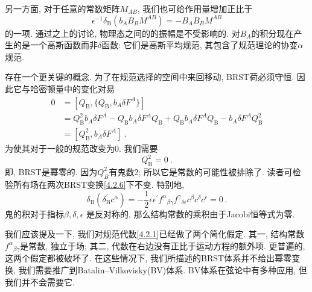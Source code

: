 另一方面, 对于任意的常数矩阵$M_{AB}$, 我们也可给作用量增加正比于
\begin{equation}
\epsilon^{-1} \delta_{\mathrm{B}}(b_{A} B_{B} M^{A B})=-B_{A} B_{B} M^{A B} \label{4.2.11}
\end{equation}
的一项. 通过之上的讨论, 物理态之间的的振幅是不受影响的. 对$B_{A}$的积分现在产生的是一个高斯函数而非$\delta$函数: 它们是高斯平均规范, 其包含了规范理论的协变$\alpha$规范. 

存在一个更关键的概念. 为了在规范选择的空间中来回移动, BRST荷必须守恒. 因此它与哈密顿量中的变化对易 
\begin{align}
0 &=[Q_{\mathrm{B}},\{Q_{\mathrm{B}}, b_{A} \delta F^{A}\}]  	\nonumber\\
&=Q_{\mathrm{B}}^{2} b_{A} \delta F^{A}-Q_{\mathrm{B}} b_{A} \delta F^{A} Q_{\mathrm{B}}+Q_{\mathrm{B}} b_{A} \delta F^{A} Q_{\mathrm{B}}-b_{A} \delta F^{A} Q_{\mathrm{B}}^{2}  \nonumber \\
&=[Q_{\mathrm{B}}^{2}, b_{A} \delta F^{A}] \:. \label{4.2.12}
\end{align}
为使其对于一般的规范改变为0. 我们需要
\begin{equation}
Q_{\mathrm{B}}^{2}=0 \:. \label{4.2.13}
\end{equation}
即, BRST是幂零的. 因为$Q_B^2$有鬼数2; 所以它是常数的可能性被排除了. 读者可检验所有场在两次BRST变换\eqref{4.2.6}下不变. 特别地,         
\begin{equation}
\delta_{\mathrm{B}}(\delta_{\mathrm{B}}^{\prime} c^{\alpha})=-\frac{1}{2} \epsilon \epsilon^{\prime} f^{\alpha}{}_{\beta \gamma} f^{\gamma}{}_{\delta \epsilon} c^{\beta} c^{\delta} c^{\epsilon}=0 \:. \label{4.2.14}
\end{equation}
鬼的积对于指标$\beta, \delta, \epsilon$ 是反对称的, 那么结构常数的乘积由于Jacobi恒等式为零.

我们应该提及一下, 我们对规范代数\eqref{4.2.1}已经做了两个简化假定. 其一, 结构常数$f^{\alpha}{ }_{\beta \gamma}$是常数, 独立于场; 其二, 代数在右边没有正比于运动方程的额外项. 更普遍的, 这两个假定都被破坏了. 在这些情况下, 我们所描述的BRST体系并不给出幂零变换, 我们需要推广到Batalin–Vilkovisky(BV)体系. BV体系在弦论中有多种应用, 但我们并不会需要它. 

